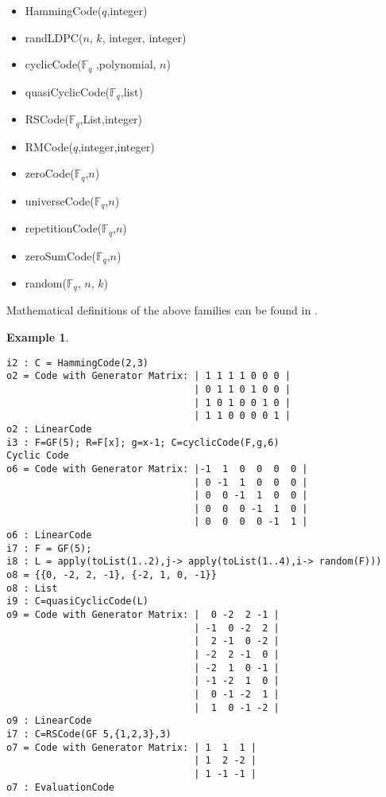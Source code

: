 \documentclass[12pt]{amsart}
\theoremstyle{plain}
\newtheorem{example}[theorem]{Example}
\begin{document}
\medskip

\begin{minipage}[t]{0.5\textwidth}
\begin{itemize}[leftmargin=1 cm]
\item HammingCode($q$,integer)
\item randLDPC($n$, $k$, integer, integer)
\item cyclicCode($\mathbb{F}_q$ ,polynomial, $n$)
\item quasiCyclicCode($\mathbb{F}_q$,list)
\item RSCode($\mathbb{F}_q$,List,integer)
\item RMCode($q$,integer,integer)
\end{itemize}
\end{minipage}
\begin{minipage}[t]{0.5\textwidth}
\begin{itemize}[leftmargin=1 cm]
\item zeroCode($\mathbb{F}_q$,$n$)
\item universeCode($\mathbb{F}_q$,$n$)
\item repetitionCode($\mathbb{F}_q$,$n$)
\item zeroSumCode($\mathbb{F}_q$,$n$)
\item random($\mathbb{F}_q$, $n$, $k$)

\end{itemize}
\end{minipage}

\medskip

Mathematical definitions of the above families can be found in \cite{huf-pless,MacWilliams-Sloane,van-lint}.

\begin{example}
$\,$
\begin{verbatim}
i2 : C = HammingCode(2,3)
o2 = Code with Generator Matrix: | 1 1 1 1 0 0 0 |
                                 | 0 1 1 0 1 0 0 |
                                 | 1 0 1 0 0 1 0 |
                                 | 1 1 0 0 0 0 1 |
o2 : LinearCode
i3 : F=GF(5); R=F[x]; g=x-1; C=cyclicCode(F,g,6)
Cyclic Code
o6 = Code with Generator Matrix: |-1  1  0  0  0  0 |
                                 | 0 -1  1  0  0  0 |
                                 | 0  0 -1  1  0  0 |
                                 | 0  0  0 -1  1  0 |
                                 | 0  0  0  0 -1  1 |
o6 : LinearCode
i7 : F = GF(5);
i8 : L = apply(toList(1..2),j-> apply(toList(1..4),i-> random(F)))
o8 = {{0, -2, 2, -1}, {-2, 1, 0, -1}}
o8 : List
i9 : C=quasiCyclicCode(L)
o9 = Code with Generator Matrix: |  0 -2  2 -1 |
                                 | -1  0 -2  2 |
                                 |  2 -1  0 -2 |
                                 | -2  2 -1  0 |
                                 | -2  1  0 -1 |
                                 | -1 -2  1  0 |
                                 |  0 -1 -2  1 |
                                 |  1  0 -1 -2 |
o9 : LinearCode
i7 : C=RSCode(GF 5,{1,2,3},3)
o7 = Code with Generator Matrix: | 1  1  1 |
                                 | 1  2 -2 |
                                 | 1 -1 -1 |
o7 : EvaluationCode
\end{verbatim}
\end{example}
\end{document}
